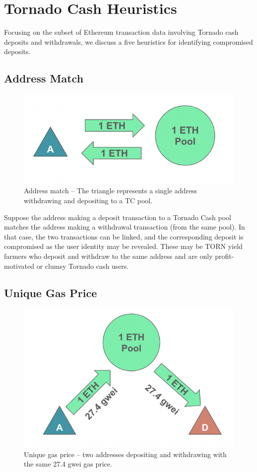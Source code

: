 \section{Tornado Cash Heuristics}
\label{sec:tornado}

Focusing on the subset of Ethereum transaction data involving Tornado cash deposits and withdrawals, we discuss a five heuristics for identifying compromised deposits.

\subsection{Address Match}

\begin{figure}[h!]
\centering
\includegraphics[width=0.75\linewidth]{figures/tcash/h1.png}
\caption{Address match -- The triangle represents a single address withdrawing and depositing to a TC pool.}
\label{fig:tornado}
\end{figure}

Suppose the address making a deposit transaction to a Tornado Cash pool matches the address making a withdrawal transaction (from the same pool). In that case, the two transactions can be linked, and the corresponding deposit is compromised as the user identity may be revealed. These may be TORN yield farmers who deposit and withdraw to the same address and are only profit-motivated or clumsy Tornado cash users.

\subsection{Unique Gas Price}

\begin{figure}[h!]
\centering
\includegraphics[width=0.7\linewidth]{figures/tcash/h2.png}
\caption{Unique gas price -- two addresses depositing and withdrawing with the same 27.4 gwei gas price.}
\label{fig:tornado}
\end{figure}

